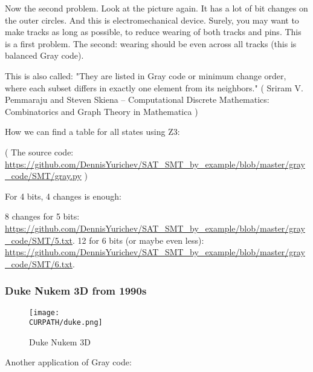 Now the second problem. Look at the picture again. It has a lot of bit changes on the outer circles.
And this is electromechanical device.
Surely, you may want to make tracks as long as possible, to reduce wearing of both tracks and pins.
This is a first problem.
The second: wearing should be even across all tracks (this is balanced Gray code).

This is also called:
"They are listed in Gray code or minimum change order, where each subset differs in exactly one element from its neighbors."
( Sriram V. Pemmaraju and Steven Skiena -- Computational Discrete Mathematics: Combinatorics and Graph Theory in Mathematica )

How we can find a table for all states using Z3:



( The source code: \url{https://github.com/DennisYurichev/SAT_SMT_by_example/blob/master/gray_code/SMT/gray.py} )

For 4 bits, 4 changes is enough:



8 changes for 5 bits: \url{https://github.com/DennisYurichev/SAT_SMT_by_example/blob/master/gray_code/SMT/5.txt}.
12 for 6 bits (or maybe even less): 
\url{https://github.com/DennisYurichev/SAT_SMT_by_example/blob/master/gray_code/SMT/6.txt}.

\subsubsection{Duke Nukem 3D from 1990s}

\begin{figure}[H]
\centering
\texttt{[image: \\CURPATH/duke.png]}
\caption{Duke Nukem 3D}
\end{figure}

Another application of Gray code:


